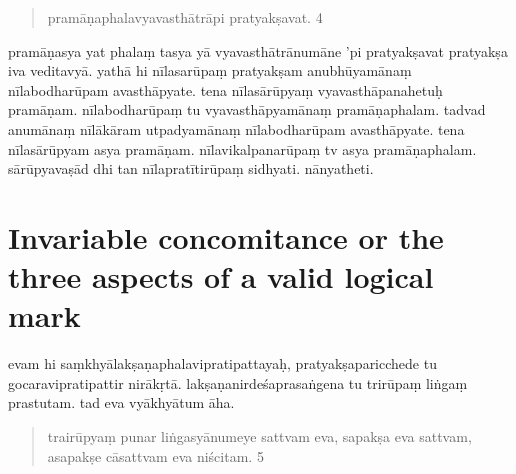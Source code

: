 \documentclass{article}
\begin{document}
\begin{quote}
pramāṇaphalavyavasthātrāpi pratyakṣavat. 4
\end{quote} 

pramāṇasya yat phalaṃ tasya yā vyavasthātrānumāne 'pi pratyakṣavat pratyakṣa iva veditavyā. 
 \pend
 \pstart
{}yathā hi nīlasarūpaṃ pratyakṣam anubhūyamānaṃ nīlabodharūpam avasthāpyate. tena nīlasārūpyaṃ vyavasthāpanahetuḥ pramāṇam. nīlabodharūpaṃ tu vyavasthāpyamānaṃ pramāṇaphalam. tadvad anumānaṃ nīlākāram utpadyamānaṃ nīlabodharūpam avasthāpyate. tena nīlasārūpyam asya pramāṇam. nīlavikalpanarūpaṃ tv asya pramāṇaphalam. sārūpyavaṣād dhi tan nīlapratītirūpaṃ sidhyati. nānyatheti.
\pend
{}\baselineskip
\section{Invariable concomitance or the three aspects of a valid logical mark}
\pstart
evam hi saṃkhyālakṣaṇaphalavipratipattayaḥ, pratyakṣaparicchede tu gocaravipratipattir nirākṛtā. lakṣaṇanirdeśaprasaṅgena tu trirūpaṃ liṅgaṃ prastutam. tad eva vyākhyātum āha. 

 \begin{quote}
trairūpyaṃ punar liṅgasyānumeye sattvam eva, sapakṣa eva sattvam, asapakṣe cāsattvam eva niścitam. 5
\end{quote}
\end{document}
